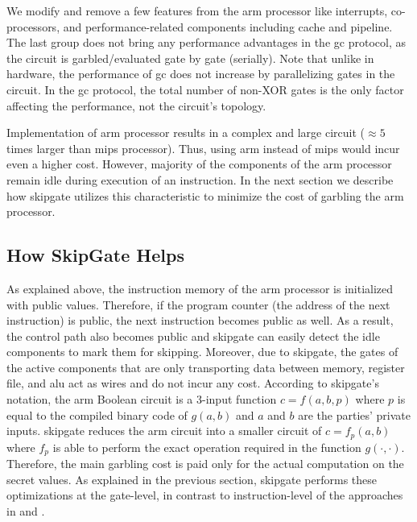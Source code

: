 We modify and remove a few features from the \gls{arm} processor like interrupts, co-processors, and performance-related components including cache and pipeline.
The last group does not bring any performance advantages in the \acrshort{gc} protocol, as the circuit is garbled/evaluated gate by gate (serially).
Note that unlike in hardware, the performance of \acrshort{gc} does not increase by parallelizing gates in the circuit.
In the \acrshort{gc} protocol, the total number of non-XOR gates is the only factor affecting the performance, not the circuit's topology.

Implementation of \gls{arm} processor results in a complex and large circuit ($\approx 5$ times larger than \gls{mips} processor).
Thus, using \gls{arm} instead of \gls{mips} would incur even a higher cost.
However, majority of the components of the \gls{arm} processor remain idle during  execution of an instruction.
In the next section we describe how \gls{skipgate} utilizes this characteristic to minimize the cost of garbling the \gls{arm} processor.

\subsection{How {SkipGate} Helps}
As explained above, the instruction memory of the \gls{arm} processor is initialized with public values.
Therefore, if the program counter (the address of the next instruction) is public, the next instruction becomes public as well.
As a result, the control path also becomes public and \gls{skipgate} can easily detect the idle components to mark them for skipping.
Moreover, due to \gls{skipgate}, the gates of the active components that are only transporting data between memory, register file, and \acrshort{alu} act as wires and do not incur any cost.
According to \gls{skipgate}'s notation, the \gls{arm} Boolean circuit is a 3-input function $c = f(a,b,p)$ where $p$ is equal to the compiled binary code of $g(a,b)$ and $a$ and $b$ are the parties' private inputs.
\gls{skipgate} reduces the \gls{arm} circuit into a smaller circuit of $c = f_p(a,b)$ where $f_p$ is able to perform the exact operation required in the function $g(\cdot,\cdot)$.
Therefore, the main garbling cost is paid only for the actual computation on the secret values.
As explained in the previous section, \gls{skipgate} performs these optimizations at the gate-level, in contrast to instruction-level of the approaches in  and \cite{wang2016secure}.

